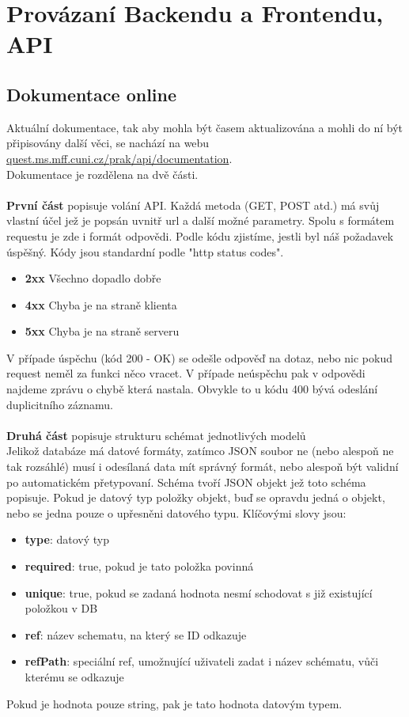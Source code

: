 \chapter{Provázaní Backendu a Frontendu, API}

\section{Dokumentace online}
Aktuální dokumentace, tak aby mohla být časem aktualizována a mohli do ní
být připisovány další věci, se nachází na webu 
\href{http://quest.ms.mff.cuni.cz/prak/api/documentation}{quest.ms.mff.cuni.cz/prak/api/documentation}.
\\
Dokumentace je rozdělena na dvě části.
\\
\\
\textbf{První část} popisuje volání API. 
Každá metoda (GET, POST atd.) má svůj vlastní účel
jež je popsán uvnitř url a další možné parametry.
Spolu s formátem requestu je zde i formát odpovědi.
Podle kódu zjistíme, jestli byl náš požadavek úspěšný.
Kódy jsou standardní podle "http status codes".
\begin{itemize}
	\item \textbf{2xx} Všechno dopadlo dobře
	\item \textbf{4xx} Chyba je na straně klienta
	\item \textbf{5xx} Chyba je na straně serveru
\end{itemize}
V případe úspěchu (kód 200 - OK) se odešle odpověď na dotaz, nebo
nic pokud request neměl za funkci něco vracet. 
V případe neúspěchu pak v odpovědi najdeme zprávu o chybě která nastala.
Obvykle to u kódu 400 bývá odeslání duplicitního záznamu.
\\
\\
\textbf{Druhá část} popisuje strukturu schémat jednotlivých modelů\\
Jelikož databáze má datové formáty, zatímco JSON soubor ne (nebo alespoň ne tak rozsáhlé)
musí i odesílaná data mít správný formát, nebo alespoň být validní po automatickém
přetypovaní.
Schéma tvoří JSON objekt jež toto schéma popisuje.
Pokud je datový typ položky objekt, buď se opravdu jedná o objekt, nebo
se jedna pouze o upřesněni datového typu.
Klíčovými slovy jsou:
\begin{itemize}
	\item \textbf{type}: datový typ
	\item \textbf{required}: true, pokud je tato položka povinná
	\item \textbf{unique}: true, pokud se zadaná hodnota nesmí schodovat s již existující položkou v DB
	\item \textbf{ref}: název schematu, na který se ID odkazuje
	\item \textbf{refPath}: speciální ref, umožnující uživateli zadat i název schématu, vůči kterému se odkazuje
\end{itemize}
Pokud je hodnota pouze string, pak je tato hodnota datovým typem.

